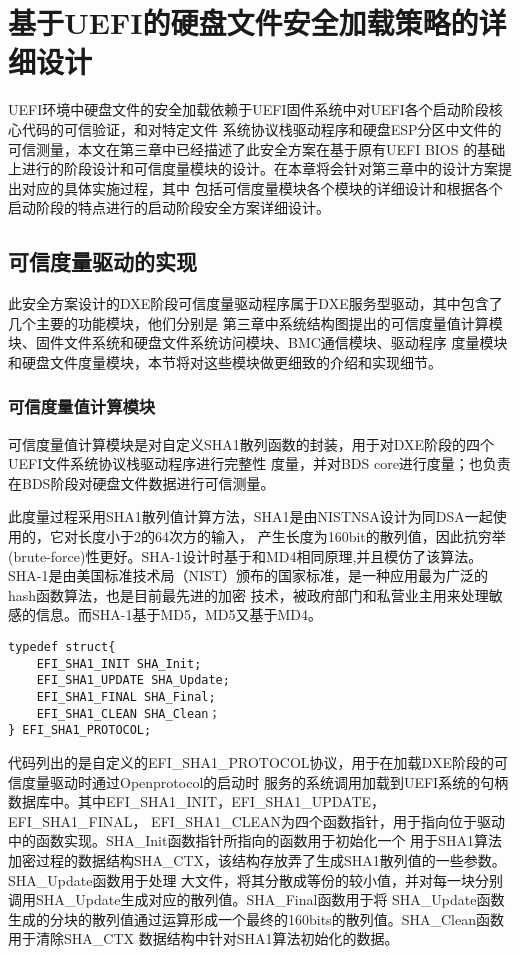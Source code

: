 %
%
\chapter{基于UEFI的硬盘文件安全加载策略的详细设计}
UEFI环境中硬盘文件的安全加载依赖于UEFI固件系统中对UEFI各个启动阶段核心代码的可信验证，和对特定文件
系统协议栈驱动程序和硬盘ESP分区中文件的可信测量，本文在第三章中已经描述了此安全方案在基于原有UEFI BIOS
的基础上进行的阶段设计和可信度量模块的设计。在本章将会针对第三章中的设计方案提出对应的具体实施过程，其中
包括可信度量模块各个模块的详细设计和根据各个启动阶段的特点进行的启动阶段安全方案详细设计。

%
%
\section{可信度量驱动的实现}
此安全方案设计的DXE阶段可信度量驱动程序属于DXE服务型驱动，其中包含了几个主要的功能模块，他们分别是
第三章中系统结构图提出的可信度量值计算模块、固件文件系统和硬盘文件系统访问模块、BMC通信模块、驱动程序
度量模块和硬盘文件度量模块，本节将对这些模块做更细致的介绍和实现细节。

\subsection{可信度量值计算模块}
可信度量值计算模块是对自定义SHA1散列函数的封装，用于对DXE阶段的四个UEFI文件系统协议栈驱动程序进行完整性
度量，并对BDS core进行度量；也负责在BDS阶段对硬盘文件数据进行可信测量。
\par 此度量过程采用SHA1散列值计算方法，SHA1是由NISTNSA设计为同DSA一起使用的，它对长度小于2的64次方的输入，
产生长度为160bit的散列值，因此抗穷举(brute-force)性更好。SHA-1设计时基于和MD4相同原理,并且模仿了该算法。
SHA-1是由美国标准技术局（NIST）颁布的国家标准，是一种应用最为广泛的hash函数算法，也是目前最先进的加密
技术，被政府部门和私营业主用来处理敏感的信息。而SHA-1基于MD5，MD5又基于MD4。

\begin{lstlisting}
typedef struct{
    EFI_SHA1_INIT SHA_Init;
    EFI_SHA1_UPDATE SHA_Update;
    EFI_SHA1_FINAL SHA_Final;
    EFI_SHA1_CLEAN SHA_Clean；
} EFI_SHA1_PROTOCOL;
\end{lstlisting}

代码列出的是自定义的EFI\_SHA1\_PROTOCOL协议，用于在加载DXE阶段的可信度量驱动时通过Openprotocol的启动时
服务的系统调用加载到UEFI系统的句柄数据库中。其中EFI\_SHA1\_INIT，EFI\_SHA1\_UPDATE，EFI\_SHA1\_FINAL，
EFI\_SHA1\_CLEAN为四个函数指针，用于指向位于驱动中的函数实现。SHA\_Init函数指针所指向的函数用于初始化一个
用于SHA1算法加密过程的数据结构SHA\_CTX，该结构存放弄了生成SHA1散列值的一些参数。SHA\_Update函数用于处理
大文件，将其分散成等份的较小值，并对每一块分别调用SHA\_Update生成对应的散列值。SHA\_Final函数用于将
SHA\_Update函数生成的分块的散列值通过运算形成一个最终的160bits的散列值。SHA\_Clean函数用于清除SHA\_CTX
数据结构中针对SHA1算法初始化的数据。

